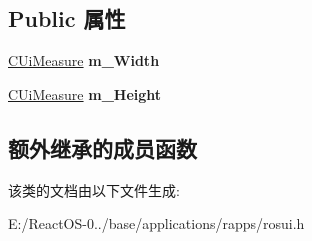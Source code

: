 \subsection*{Public 属性}
\begin{DoxyCompactItemize}
\item 
\mbox{\label{class_c_ui_panel_a0e4d4abd1cd3856a318e21ced9adf409}} 
\hyperlink{class_c_ui_measure}{C\+Ui\+Measure} {\bfseries m\+\_\+\+Width}
\item 
\mbox{\label{class_c_ui_panel_a1be0b9635c6cd3b285b9d2de797bc053}} 
\hyperlink{class_c_ui_measure}{C\+Ui\+Measure} {\bfseries m\+\_\+\+Height}
\end{DoxyCompactItemize}
\subsection*{额外继承的成员函数}


该类的文档由以下文件生成\+:\begin{DoxyCompactItemize}
\item 
E\+:/\+React\+O\+S-\/0../base/applications/rapps/rosui.\+h\end{DoxyCompactItemize}
